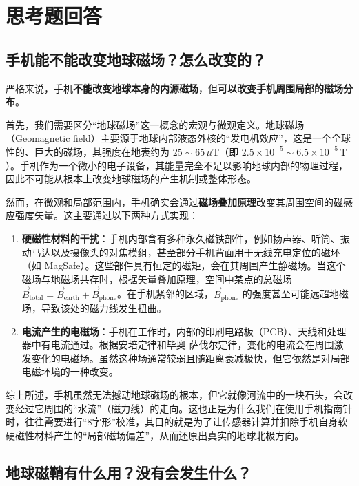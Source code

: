 \documentclass[11pt]{article}
\begin{document}
\section{思考题回答}

\subsection{手机能不能改变地球磁场？怎么改变的？}

严格来说，手机\textbf{不能改变地球本身的内源磁场}，但\textbf{可以改变手机周围局部的磁场分布}。

首先，我们需要区分“地球磁场”这一概念的宏观与微观定义。地球磁场（Geomagnetic field）主要源于地球内部液态外核的“发电机效应”，这是一个全球性的、巨大的磁场，其强度在地表约为 $25 \sim 65\, \mu\text{T}$（即 $2.5 \times 10^{-5} \sim 6.5 \times 10^{-5}\,\text{T}$）。手机作为一个微小的电子设备，其能量完全不足以影响地球内部的物理过程，因此不可能从根本上改变地球磁场的产生机制或整体形态。

然而，在微观和局部范围内，手机确实会通过\textbf{磁场叠加原理}改变其周围空间的磁感应强度矢量。这主要通过以下两种方式实现：

\begin{enumerate}
    \item \textbf{硬磁性材料的干扰}：手机内部含有多种永久磁铁部件，例如扬声器、听筒、振动马达以及摄像头的对焦模组，甚至部分手机背面用于无线充电定位的磁环（如 MagSafe）。这些部件具有恒定的磁矩，会在其周围产生静磁场。当这个磁场与地磁场共存时，根据矢量叠加原理，空间中某点的总磁场 $\vec{B}_{\text{total}} = \vec{B}_{\text{earth}} + \vec{B}_{\text{phone}}$。在手机紧邻的区域，$\vec{B}_{\text{phone}}$ 的强度甚至可能远超地磁场，导致该处的磁力线发生扭曲。
    \item \textbf{电流产生的电磁场}：手机在工作时，内部的印刷电路板（PCB）、天线和处理器中有电流通过。根据安培定律和毕奥-萨伐尔定律，变化的电流会在周围激发变化的电磁场。虽然这种场通常较弱且随距离衰减极快，但它依然是对局部电磁环境的一种改变。
\end{enumerate}

综上所述，手机虽然无法撼动地球磁场的根本，但它就像河流中的一块石头，会改变经过它周围的“水流”（磁力线）的走向。这也正是为什么我们在使用手机指南针时，往往需要进行“8字形”校准，其目的就是为了让传感器计算并扣除手机自身软硬磁性材料产生的“局部磁场偏差”，从而还原出真实的地球北极方向。

\subsection{地球磁鞘有什么用？没有会发生什么？}
\end{document}
